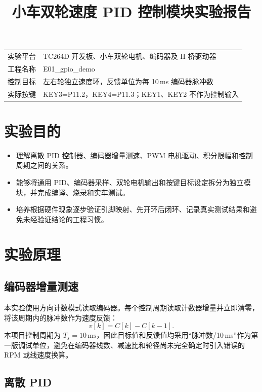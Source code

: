 \documentclass[11pt,a4paper,fontset=fandol]{ctexart}
\title{\heiti 小车双轮速度 PID 控制模块实验报告}
\author{}
\date{}
\begin{document}
\maketitle
\vspace{-2em}

\begin{center}
\begin{tabular}{p{}p{}}
\toprule
实验平台 & TC264D 开发板、小车双轮电机、编码器及 H 桥驱动器 \\
工程名称 & E01\_gpio\_demo \\
控制目标 & 左右轮独立速度环，反馈单位为每 10\,ms 编码器脉冲数 \\
实际按键 & KEY3=P11.2，KEY4=P11.3；KEY1、KEY2 不作为控制输入 \\
\bottomrule
\end{tabular}
\end{center}

\section{实验目的}

\begin{itemize}
\item[\textbf{知识：}] 理解离散 PID 控制器、编码器增量测速、PWM 电机驱动、积分限幅和控制周期之间的关系。
\item[\textbf{能力：}] 能够将通用 PID、编码器采样、双轮电机输出和按键目标设定拆分为独立模块，并完成编译、烧录和实车测试。
\item[\textbf{素养：}] 培养根据硬件现象逐步验证引脚映射、先开环后闭环、记录真实测试结果和避免未经验证结论的工程习惯。
\end{itemize}

\section{实验原理}

\subsection{编码器增量测速}

本实验使用方向计数模式读取编码器。每个控制周期读取计数器增量并立即清零，将该周期内的脉冲数作为速度反馈：
\[
v[k] = C[k]-C[k-1].
\]
本项目控制周期为 $T_s=10\,\mathrm{ms}$，因此目标值和反馈值均采用“脉冲数/10\,ms”作为第一版调试单位，避免在编码器线数、减速比和轮径尚未完全确定时引入错误的 RPM 或线速度换算。

\subsection{离散 PID}
\end{document}
